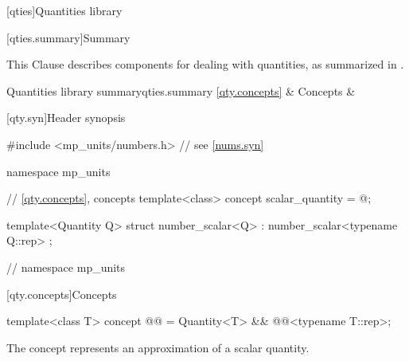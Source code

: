 [qties]{Quantities library}

[qties.summary]{Summary}

\pnum
This Clause describes components for dealing with quantities,
as summarized in .

\begin{modularlibsumtab}{Quantities library summary}{qties.summary}
\ref{qty.concepts}      & Concepts                               &  \\
\end{modularlibsumtab}

[qty.syn]{Header  synopsis}

%
%
\begin{codeblock}
#include <mp_units/numbers.h>  // see \ref{nums.syn}

namespace mp_units {

// \ref{qty.concepts}, concepts
template<class>
concept scalar_quantity = @\seebelow@;

template<Quantity Q>
struct number_scalar<Q> : number_scalar<typename Q::rep> {};

}  // namespace mp_units
\end{codeblock}

[qty.concepts]{Concepts}

\begin{itemdecl}
template<class T>
concept @@ = Quantity<T> && @@<typename T::rep>;
\end{itemdecl}

\begin{itemdescr}
\pnum
\begin{note}
The  concept
represents an approximation of a scalar quantity.
\end{note}
\end{itemdescr}
